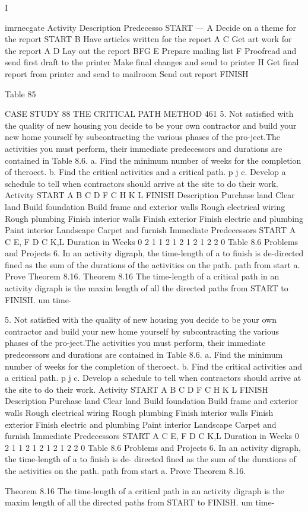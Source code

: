 I 

imrnecgate Activity Description Predecesso 
START — A Decide on a theme for the report START B Have articles written for the report A C Get art work for the report A D Lay out the report BFG E Prepare mailing list F Proofread and send first draft to the printer Make final changes and send to printer H Get final report from printer and send to mailroom Send out report FINISH 

Table 85 



CASE STUDY 88 THE CRITICAL PATH METHOD 
461 
5. Not satisfied with the quality of new housing you decide to be your own contractor and build your new home yourself by subcontracting the various phases of the pro-ject.The activities you must perform, their immediate predecessors and durations are contained in Table 8.6. a. Find the minimum number of weeks for the completion of theroect. b. Find the critical activities and a critical path. p j c. Develop a schedule to tell when contractors should arrive at the site to do their work. 
Activity START A B C D F C H K L FINISH Description Purchase land Clear land Build foundation Build frame and exterior walls Rough electrical wiring Rough plumbing Finish interior walls Finish exterior Finish electric and plumbing Paint interior Landscape Carpet and furnish Immediate Predecessors START A C E, F D C K,L Duration in Weeks 0 2 1 1 2 1 2 1 2 1 2 2 0 
Table 8.6 
Problems and Projects 6. In an activity digraph, the time-length of a to finish is de-directed fined as the sum of the durations of the activities on the path. path from start a. Prove Theorem 8.16. 
Theorem 8.16 The time-length of a critical path in an activity digraph is the maxim length of all the directed paths from START to FINISH. um time- 

5. Not satisfied with the quality of new housing you decide to be your own contractor 
and build your new home yourself by subcontracting the various phases of the pro-ject.The activities you must perform, their immediate predecessors and durations 
are contained in Table 8.6. 
a. Find the minimum number of weeks for the completion of theroect. 
b. Find the critical activities and a critical path. p j 
c. Develop a schedule to tell when contractors should arrive at the site to do their 
work. 
Activity START A B C D F C H K L FINISH Description Purchase land Clear land Build foundation Build frame and exterior walls Rough electrical wiring Rough plumbing Finish interior walls Finish exterior Finish electric and plumbing Paint interior Landscape Carpet and furnish Immediate Predecessors START A C E, F D C K,L Duration in Weeks 0 2 1 1 2 1 2 1 2 1 2 2 0 Table 8.6 
Problems and Projects 
6. In an activity digraph, the time-length of a to finish is de-
directed 
fined as the sum of the durations of the activities on the path. 
path from start 
a. Prove Theorem 8.16. 
\begin{framed}
Theorem 8.16 
The time-length of a critical path in an activity digraph is the maxim 
length of all the directed paths from START to FINISH. um time- 
\end{framed}

